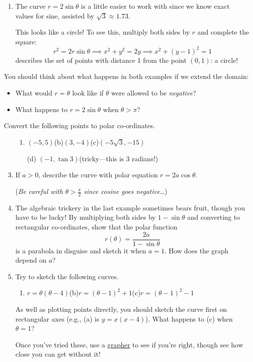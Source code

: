\begin{examples}{}{}
\begin{enumerate}
	  \item The curve $r=2\sin\theta$ is a little easier to work with since we know exact values for sine, assisted by $\sqrt 3\approx 1.73$.\par
		This looks like a circle! To see this, multiply both sides by $r$ and complete the square:
		\[
			r^2=2r\sin\theta\implies x^2+y^2=2y \implies x^2+(y-1)^2=1
		\]
		describes the set of points with distance 1 from the point $(0,1)$: a circle!
	\end{enumerate}
\end{examples}

You should think about what happens in both examples if we extend the domain:
\begin{itemize}
  \item What would $r=\theta$ look like if $\theta$ were allowed to be \emph{negative}?
  \item What happens to $r=2\sin\theta$ when $\theta>\pi$? 
\end{itemize}


\clearpage


\begin{exercises}{}{}
	\exstart Convert the following points to polar co-ordinates.
	\begin{enumerate}\setcounter{enumi}{1}
	  \item[]\begin{enumerate}
	    \item $(-5,5)$\qquad (b)\lstsp $(3,-4)$\qquad (c)\lstsp $(-5\sqrt 3,-15)$
	    \item[(d)] $(-1,\tan 3)$\quad (tricky---this is 3 radians!)
	  \end{enumerate}
	  
	  \item If $a>0$, describe the curve with polar equation $r=2a\cos\theta$.\par
	  (\emph{Be careful with $\theta>\frac\pi 2$ since cosine goes negative\ldots})
	  
	  \item The algebraic trickery in the last example sometimes bears fruit, though you have to be lucky! By multiplying both sides by $1-\sin\theta$ and converting to rectangular co-ordinates, show that the polar function
		\[
			r(\theta)=\frac{2a}{1-\sin\theta}
		\]
		is a parabola in disguise and sketch it when $a=1$. How does the graph depend on $a$?
		 
	  \item Try to sketch the following curves.
		\begin{enumerate}
	  	\item $r=\theta(\theta-4)$\qquad (b)\lstsp $r=(\theta-1)^2+1$\qquad (c)\lstsp $r=(\theta-1)^2-1$
		\end{enumerate}
		As well as plotting points directly, you should sketch the curve first on rectangular axes (e.g.,{} (a) is $y=x(x-4)$). What happens to (c) when $\theta=1$?\par
		Once you've tried these, use a \href{https://www.desmos.com/calculator}{grapher} to see if you're right, though see how close you can get without it! 
	\end{enumerate}
\end{exercises}


